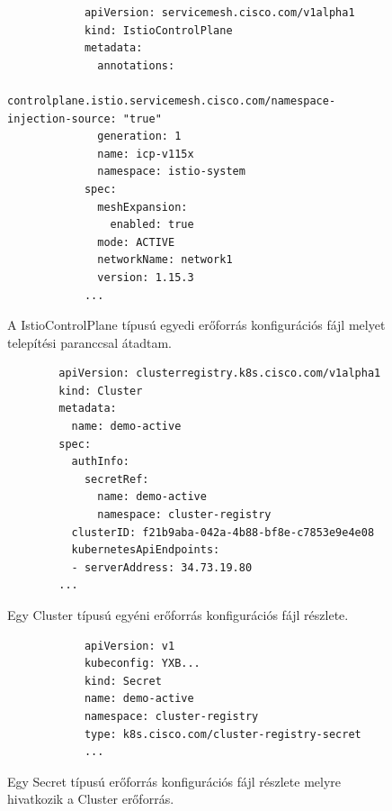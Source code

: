 \begin{figure}
    \centering
    \begin{minipage}{\linewidth}
        \begin{lstlisting}
            apiVersion: servicemesh.cisco.com/v1alpha1
            kind: IstioControlPlane
            metadata:
              annotations:
                controlplane.istio.servicemesh.cisco.com/namespace-injection-source: "true"
              generation: 1
              name: icp-v115x
              namespace: istio-system
            spec:
              meshExpansion:
                enabled: true
              mode: ACTIVE
              networkName: network1
              version: 1.15.3
            ...
        \end{lstlisting}
    \end{minipage}
    \caption{A IstioControlPlane típusú egyedi erőforrás konfigurációs fájl melyet telepítési paranccsal átadtam.}
      \label{sample-icp-config}
\end{figure}

\begin{figure}
    \centering
    \begin{minipage}{\linewidth}
      \begin{lstlisting}
        apiVersion: clusterregistry.k8s.cisco.com/v1alpha1
        kind: Cluster
        metadata:
          name: demo-active
        spec:
          authInfo:
            secretRef:
              name: demo-active
              namespace: cluster-registry
          clusterID: f21b9aba-042a-4b88-bf8e-c7853e9e4e08
          kubernetesApiEndpoints:
          - serverAddress: 34.73.19.80
        ...
      \end{lstlisting}
      \end{minipage}
      \caption{Egy Cluster típusú egyéni erőforrás konfigurációs fájl részlete.}
      \label{sample-cluster-config}
  \end{figure}

\begin{figure}
    \centering
    \begin{minipage}{\linewidth}
        \begin{lstlisting}
            apiVersion: v1
            kubeconfig: YXB...
            kind: Secret
            name: demo-active
            namespace: cluster-registry
            type: k8s.cisco.com/cluster-registry-secret
            ...
        \end{lstlisting}
    \end{minipage}
    \caption{Egy Secret típusú erőforrás konfigurációs fájl részlete melyre hivatkozik a Cluster erőforrás.}
      \label{sample-secret-config}
\end{figure}

